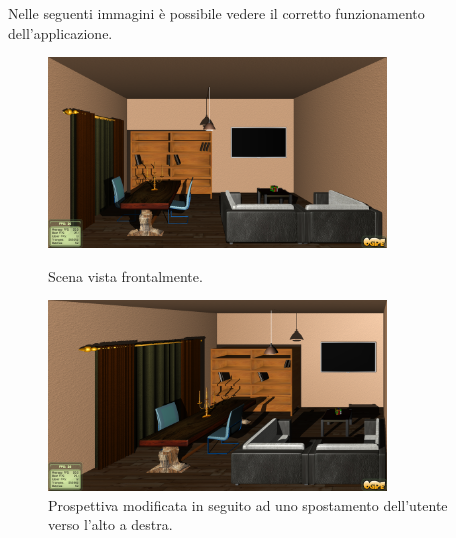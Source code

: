 Nelle seguenti immagini è possibile vedere il corretto funzionamento dell'applicazione.

\begin{figure}[htbp]
\centering
\includegraphics[width=0.8\textwidth]{images/progetto/ogre.png}
\caption{Scena vista frontalmente.\label{liv-room}}
\includegraphics[width=0.8\textwidth]{images/progetto/ogre-2.png}
\caption{Prospettiva modificata in seguito ad uno spostamento dell'utente verso l'alto a destra.\label{liv-room}}
\end{figure}
\clearpage
